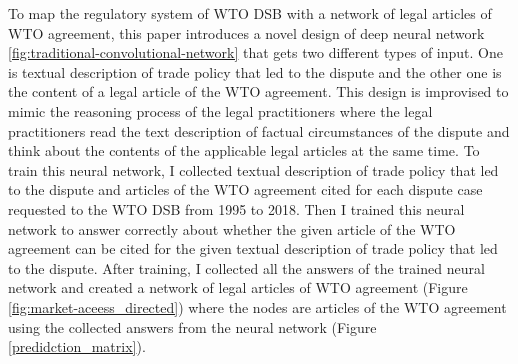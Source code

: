 To map the regulatory system of WTO DSB with 
a network of legal articles of WTO agreement,
this paper introduces a novel design of deep neural network \ref{fig:traditional-convolutional-network} that
gets two different types of input.
One is textual description of trade policy that led to the dispute and
the other one is the content of a legal article of the WTO agreement.
This design is improvised to mimic
the reasoning process of the legal practitioners
where the legal practitioners read
the text description of
factual circumstances of the dispute and think about the contents of
the applicable legal articles at the same time.
To train this neural network, I collected textual description of trade policy 
that led to the dispute and articles of the WTO agreement cited for each dispute
case requested to the WTO DSB 
from 1995 to 2018.
Then I trained this neural network to answer correctly 
about whether the given article of the WTO agreement
can be cited for the given textual description of 
trade policy that led to the dispute.
After training, I collected all the answers of the trained neural network 
and created a network of legal articles of WTO agreement (Figure \ref{fig:market-aceess_directed}) where 
the nodes are articles of the WTO agreement using 
the collected answers from the neural network (Figure \ref{predidction_matrix}).





